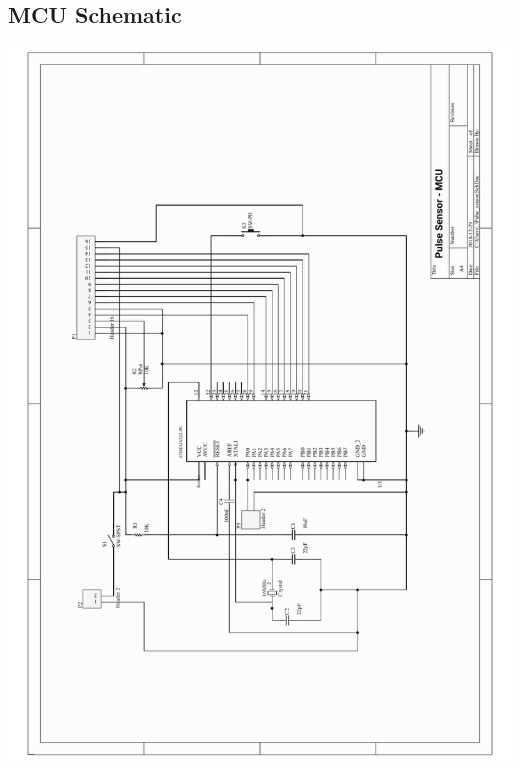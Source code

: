 \documentclass[12pt]{article}
\begin{document}
{\subsection{MCU Schematic}
\includegraphics[scale=0.9]{images/Pulse_sensor_schematic}

\newpage
}
\end{document}

